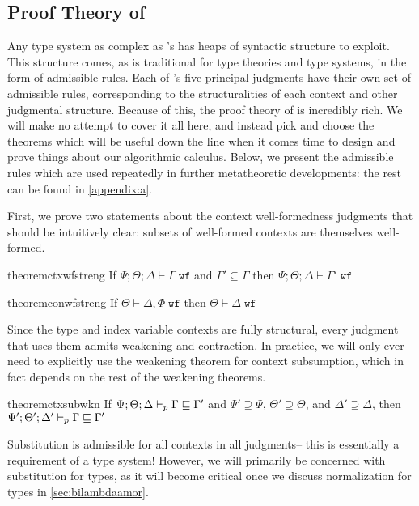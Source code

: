 \subsection{Proof Theory of \dlambdaamor}
Any type system as complex as \dlambdaamor's has heaps of syntactic structure to exploit. This structure comes, as is traditional for type theories and type systems, in the form of admissible rules. Each of \dlambdaamor's five principal judgments have their own set of admissible rules, corresponding to the structuralities of each context and other judgmental structure. Because of this, the proof theory of \dlambdaamor is incredibly rich. We will make no attempt to cover it all here, and instead pick and choose the theorems which will be useful down the line when it comes time to design and prove things about our algorithmic calculus. Below, we present the admissible rules which are used repeatedly in further metatheoretic developments: the rest can be found in \autoref{appendix:a}.

First, we prove two statements about the context well-formedness judgments that should be intuitively clear: subsets of well-formed contexts are themselves well-formed.

\begin{restatable}[]{theorem}{ctxwfstreng}
If $\Psi ; \Theta ; \Delta \vdash \Gamma \; \texttt{wf}$ and $\Gamma' \subseteq \Gamma$ then $\Psi ; \Theta ; \Delta \vdash \Gamma' \; \texttt{wf}$
\end{restatable}

\begin{restatable}[]{theorem}{conwfstreng}
If $\Theta \vdash \Delta, \Phi \; \texttt{wf}$ then $\Theta \vdash \Delta \; \texttt{wf}$
\end{restatable}

Since the type and index variable contexts are fully structural, every judgment that uses them admits weakening and contraction. In practice, we will only ever need to explicitly use the weakening theorem for context subsumption, which in fact depends on the rest of the weakening theorems.

\begin{restatable}[]{theorem}{ctxsubwkn}
\label{thm:ctx-sub-wkn}
If $\Psi ; \Theta ; \Delta \vdash_p \Gamma \sqsubseteq \Gamma'$ and $\Psi' \supseteq \Psi$, $\Theta' \supseteq \Theta$, and $\Delta' \supseteq \Delta$, then
$\Psi' ; \Theta' ; \Delta' \vdash_p \Gamma \sqsubseteq \Gamma'$
\end{restatable}

Substitution is admissible for all contexts in all judgments-- this is essentially a requirement of a type system! However, we will primarily be concerned with substitution for types, as it will become critical once we discuss normalization for types in \autoref{sec:bilambdaamor}.

